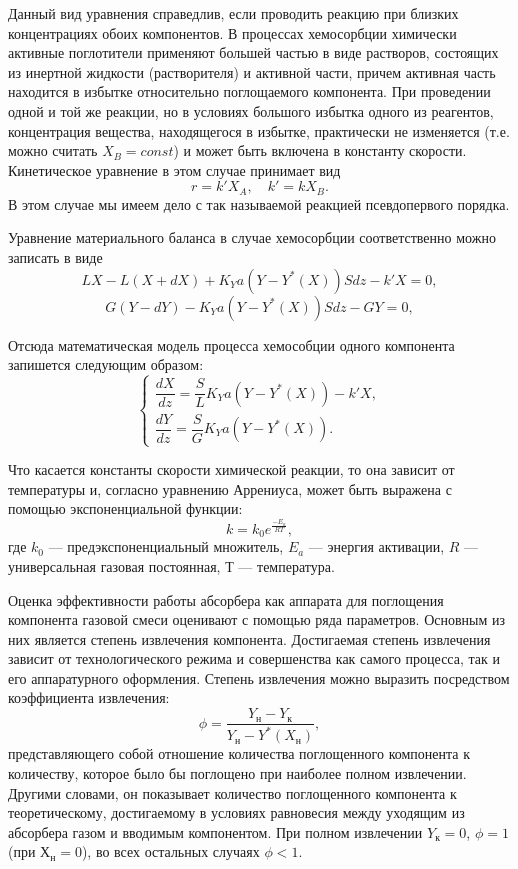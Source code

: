 Данный вид уравнения справедлив, если проводить реакцию при близких концентрациях обоих компонентов. В процессах хемосорбции химически активные поглотители применяют большей частью в виде растворов, состоящих из инертной жидкости (растворителя) и активной части, причем активная часть находится в избытке относительно поглощаемого компонента. При проведении одной и той же реакции, но в условиях большого избытка одного из реагентов, концентрация вещества, находящегося в избытке, практически не изменяется (т.е. можно считать $X_B=const$) и может быть включена в константу скорости. Кинетическое уравнение в этом случае принимает вид
\begin{equation}
r=k' X_A, \quad k'=k X_B.
\end{equation}
В этом случае мы имеем дело с так называемой реакцией псевдопервого порядка.

Уравнение материального баланса в случае хемосорбции соответственно можно записать в виде
\begin{equation}
L X - L(X +dX) + K_Y a (Y-Y^*(X))Sdz-k'X=0, 
\end{equation}
\begin{equation}
G(Y-dY)-K_Y a (Y-Y^*(X))Sdz- GY=0,
\end{equation}

Отсюда математическая модель процесса хемособции одного компонента запишется следующим образом:
\begin{equation}
\left\lbrace 
\begin{gathered} 
\dfrac{dX}{dz}=\dfrac{S}{L} K_Y a (Y-Y^*(X))-k'X,
\\
\dfrac{dY}{dz}=\dfrac{S}{G} K_Y a (Y-Y^*(X)).
\end{gathered} 
\right.
\end{equation}

Что касается константы скорости химической реакции, то она зависит от температуры и, согласно уравнению Аррениуса, может быть выражена с помощью экспоненциальной функции:
\begin{equation}
	k=k_0 e^{\frac{-E_a}{RT}},
\end{equation}
где $k_0$ --- предэкспоненциальный множитель, $E_a$ --- энергия активации, $R$ --- универсальная газовая постоянная, $Т$ --- температура. 

Оценка эффективности работы абсорбера как аппарата для поглощения компонента газовой смеси оценивают с помощью ряда параметров. Основным из них является степень извлечения компонента. Достигаемая степень извлечения зависит от технологического режима и совершенства как самого процесса, так и его аппаратурного оформления. Степень извлечения можно выразить посредством коэффициента извлечения:
\begin{equation}
	\phi =\dfrac{Y_н - Y_к}{Y_н - Y^*(X_н)},
\end{equation}
представляющего собой отношение количества поглощенного компонента к количеству, которое было бы поглощено при наиболее полном извлечении. Другими словами, он показывает количество поглощенного компонента к теоретическому, достигаемому в условиях равновесия между уходящим из абсорбера газом и вводимым компонентом. При полном извлечении $Y_к=0$, $\phi=1$ (при $Х_н=0$), во всех остальных случаях $\phi<1$.
 
